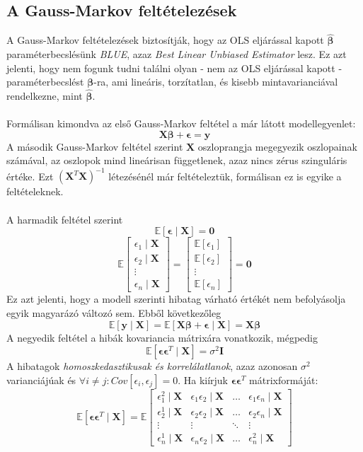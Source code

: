 \documentclass[14p]{report}
\def\pmb{\boldsymbol}
\def\ebeta{\hat{\pmb{\beta}}}
\def\e{\epsilon}
\begin{document}
\subsection{A Gauss-Markov feltételezések}
A Gauss-Markov feltételezések biztosítják, hogy az OLS eljárással kapott $\ebeta$ paraméterbecslésünk \emph{BLUE}, azaz \emph{Best Linear Unbiased Estimator} lesz. Ez azt jelenti, hogy nem fogunk tudni találni olyan - nem az OLS eljárással kapott - paraméterbecslést $\pmb{\beta}$-ra, ami lineáris, torzítatlan, és kisebb mintavarianciával rendelkezne, mint $\ebeta$.
\\
\\ 
Formálisan kimondva az első Gauss-Markov feltétel a már látott modellegyenlet:
\[
	\pmb{X}\pmb{\beta} + \pmb{\e} = \pmb{y}
\]
A második Gauss-Markov feltétel szerint $\pmb{X}$ oszloprangja megegyezik oszlopainak számával, az oszlopok mind lineárisan függetlenek, azaz nincs zérus szinguláris értéke. Ezt $(\pmb{X}^T\pmb{X})^{-1}$ létezésénél már feltételeztük, formálisan ez is egyike a feltételeknek.
\\
\\
A harmadik feltétel szerint
\[
	\mathbb{E}[\pmb{\e} \mid \pmb{X}] = \pmb{0}
\]
\[
	\mathbb{E}
	\begin{bmatrix}
	\e_1 \mid \pmb{X} \\
	\e_2 \mid \pmb{X} \\
	\vdots \\
	\e_n \mid \pmb{X}
	\end{bmatrix}
	 =
	\begin{bmatrix}
	\mathbb{E}[\e_1] \\
	\mathbb{E}[\e_2] \\
	\vdots \\
	\mathbb{E}[\e_n]
	\end{bmatrix}
	 = \pmb{0}
\]
Ez azt jelenti, hogy a modell szerinti hibatag várható értékét nem befolyásolja egyik magyarázó változó sem. Ebből következőleg
\[
	\mathbb{E}[\pmb{y} \mid \pmb{X}] = \mathbb{E}[\pmb{X}\pmb{\beta} + \pmb{\e} \mid \pmb{X}] = \pmb{X}\pmb{\beta}
\]
A negyedik feltétel a hibák kovariancia mátrixára vonatkozik, mégpedig
\[
	\mathbb{E}[\pmb{\e}\pmb{\e}^T \mid \pmb{X}] = \sigma^2\pmb{I}
\]
A hibatagok \emph{homoszkedasztikusak és korrelálatlanok}, azaz azonosan $\sigma^2$ varianciájúak és $\forall i \ne j : Cov[\e_i, \e_j] = 0$. Ha kiírjuk $\pmb{\e}\pmb{\e}^T$ mátrixformáját:
\[
	\mathbb{E}[\pmb{\e}\pmb{\e}^T \mid \pmb{X}] =
	\mathbb{E}
	\begin{bmatrix}
	\e_1^2 \mid \pmb{X} & \e_1 \e_2 \mid \pmb{X} & \dots & \e_1 \e_n \mid \pmb{X} \\
	\e_2^1 \mid \pmb{X} & \e_2 \e_2 \mid \pmb{X} & \dots & \e_2 \e_n \mid \pmb{X} \\
	\vdots & \vdots & \ddots & \vdots \\
	\e_n^1 \mid \pmb{X} & \e_n \e_2 \mid \pmb{X} & \dots & \e_n^2 \mid \pmb{X}
	\end{bmatrix}
\]
\end{document}
